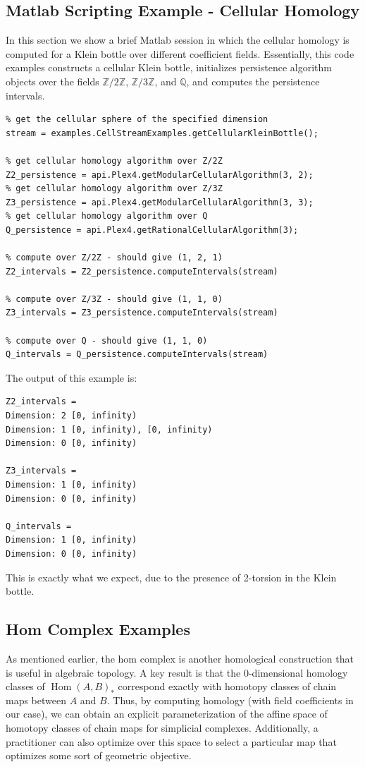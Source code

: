 \documentclass[10pt]{article}
\newcommand{\Hom}{\operatorname{Hom}}
\begin{document}
\subsection{Matlab Scripting Example - Cellular Homology}

In this section we show a brief Matlab session in which the cellular homology is computed for a Klein bottle over different coefficient fields. Essentially, this code examples constructs a cellular Klein bottle, initializes persistence algorithm objects over the fields $\mathbb{Z}/2\mathbb{Z}$, $\mathbb{Z}/3\mathbb{Z}$, and $\mathbb{Q}$, and computes the persistence intervals.

\begin{verbatim}
% get the cellular sphere of the specified dimension
stream = examples.CellStreamExamples.getCellularKleinBottle();

% get cellular homology algorithm over Z/2Z
Z2_persistence = api.Plex4.getModularCellularAlgorithm(3, 2);
% get cellular homology algorithm over Z/3Z
Z3_persistence = api.Plex4.getModularCellularAlgorithm(3, 3);
% get cellular homology algorithm over Q
Q_persistence = api.Plex4.getRationalCellularAlgorithm(3);

% compute over Z/2Z - should give (1, 2, 1)
Z2_intervals = Z2_persistence.computeIntervals(stream)

% compute over Z/3Z - should give (1, 1, 0)
Z3_intervals = Z3_persistence.computeIntervals(stream)

% compute over Q - should give (1, 1, 0)
Q_intervals = Q_persistence.computeIntervals(stream)
\end{verbatim}
The output of this example is:
\begin{verbatim}
Z2_intervals =
Dimension: 2 [0, infinity)
Dimension: 1 [0, infinity), [0, infinity)
Dimension: 0 [0, infinity)
  
Z3_intervals =
Dimension: 1 [0, infinity)
Dimension: 0 [0, infinity)
 
Q_intervals =
Dimension: 1 [0, infinity)
Dimension: 0 [0, infinity)
\end{verbatim}
This is exactly what we expect, due to the presence of 2-torsion in the Klein bottle.

\subsection{Hom Complex Examples}

As mentioned earlier, the hom complex is another homological construction that is useful in algebraic topology. A key result is that the 0-dimensional homology classes of $\Hom(A,B)_*$ correspond exactly with homotopy classes of chain maps between $A$ and $B$. Thus, by computing homology (with field coefficients in our case), we can obtain an explicit parameterization of the affine space of homotopy classes of chain maps for simplicial complexes. Additionally, a practitioner can also optimize over this space to select a particular map that optimizes some sort of geometric objective.
\end{document}
